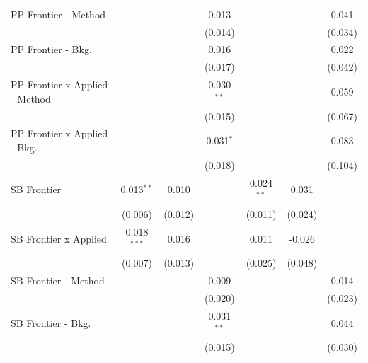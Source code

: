 \begin{tabular}{lcccccc}
   PP Frontier - Method           &               &               & 0.013         &               &               & 0.041\\   
                                  &               &               & (0.014)       &               &               & (0.034)\\   
   PP Frontier - Bkg.             &               &               & 0.016         &               &               & 0.022\\   
                                  &               &               & (0.017)       &               &               & (0.042)\\   
   PP Frontier x Applied - Method &               &               & 0.030$^{**}$  &               &               & 0.059\\   
                                  &               &               & (0.015)       &               &               & (0.067)\\   
   PP Frontier x Applied - Bkg.   &               &               & 0.031$^{*}$   &               &               & 0.083\\   
                                  &               &               & (0.018)       &               &               & (0.104)\\   
   SB Frontier                    & 0.013$^{**}$  & 0.010         &               & 0.024$^{**}$  & 0.031         &   \\   
                                  & (0.006)       & (0.012)       &               & (0.011)       & (0.024)       &   \\   
   SB Frontier x Applied          & 0.018$^{***}$ & 0.016         &               & 0.011         & -0.026        &   \\   
                                  & (0.007)       & (0.013)       &               & (0.025)       & (0.048)       &   \\   
   SB Frontier - Method           &               &               & 0.009         &               &               & 0.014\\   
                                  &               &               & (0.020)       &               &               & (0.023)\\   
   SB Frontier - Bkg.             &               &               & 0.031$^{**}$  &               &               & 0.044\\   
                                  &               &               & (0.015)       &               &               & (0.030)\\   

\end{tabular}
